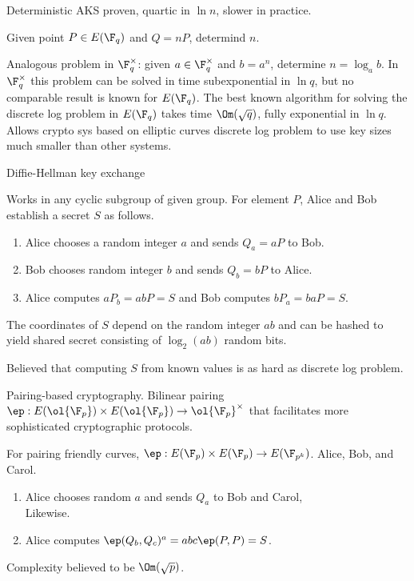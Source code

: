 Deterministic AKS proven, quartic in $\ln n$, slower in practice.

\begin{pr}
Given  point $P\in E(\F_q)$ and $Q=nP$, determind $n$.
\end{pr}
Analogous problem in $\F_q^{\times}$: given $a\in \F_q^{\times}$ and $b=a^n$, determine $n=\log_ab$. In $\F_q^{\times}$ this problem can be solved in time subexponential in $\ln q$, but no comparable result is known for $E(\F_q)$. The best known algorithm for solving the discrete log problem in $E(\F_q)$ takes time $\Om(\sqrt q)$, fully exponential in $\ln q$. Allows crypto sys based on elliptic curves discrete log problem to use key sizes much smaller than other systems. 


Diffie-Hellman key exchange

Works in any cyclic subgroup of given group.
For element $P$, Alice and Bob establish a secret $S$ as follows.
\begin{enumerate}
\item
Alice chooses a random integer $a$ and sends $Q_a=aP$ to Bob.
\item
Bob chooses  random integer $b$ and sends $Q_b=bP$ to Alice.
\item
Alice computes $aP_b=abP=S$ and Bob computes $bP_a=baP=S$.
\end{enumerate}
The coordinates of $S$ depend on the random integer $ab$ and can be hashed to yield shared secret consisting of $\log_2(ab)$ random bits.

Believed that computing $S$ from known values is as hard as discrete log problem.

Pairing-based cryptography. Bilinear pairing $\ep:E(\ol{\F_p})\times E(\ol{\F_p})\to \ol{\F_{p}}^{\times}$ that facilitates more sophisticated cryptographic protocols. 

For pairing friendly curves, $\ep:E(\F_p)\times E(\F_p)\to E(\F_{p^k})$. 
Alice, Bob, and Carol.
\begin{enumerate}
\item
Alice chooses random $a$ and sends $Q_a$ to Bob and Carol,\\
Likewise.
\item Alice computes $\ep(Q_b,Q_c)^a=abc \ep(P,P)=S$.
\end{enumerate}
Complexity believed to be $\Om(\sqrt p)$.
